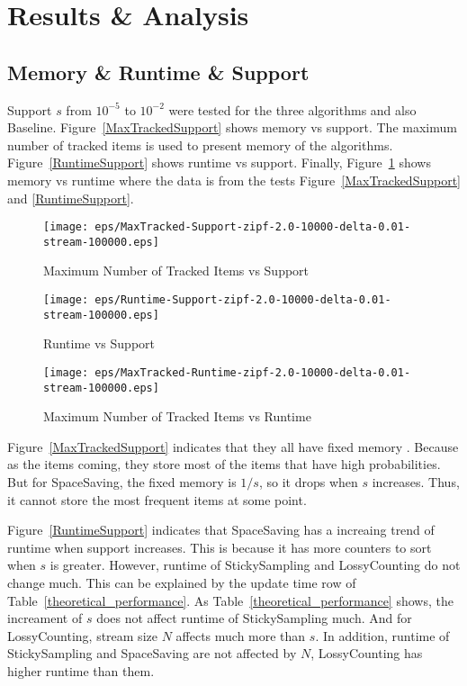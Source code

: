 \documentclass[10pt]{article}
\begin{document}
\section{Results \& Analysis} \label{resultsanalysis}

\subsection{Memory \& Runtime \& Support}
Support $s$ from $10^{-5}$ to $10^{-2}$ were tested for the three algorithms and also Baseline.
Figure~\ref{MaxTrackedSupport} shows memory vs support. 
The maximum number of tracked items is used to present memory of the algorithms.
Figure~\ref{RuntimeSupport} shows runtime vs support.
Finally, Figure~\ref{MaxTrackedRuntime} shows memory vs runtime 
where the data is from the tests Figure~\ref{MaxTrackedSupport} and \ref{RuntimeSupport}.

\begin{figure}[!htb]
      \begin{minipage}{0.48\textwidth}
        \centering
        \texttt{[image: eps/MaxTracked-Support-zipf-2.0-10000-delta-0.01-stream-100000.eps]}
        \caption{Maximum Number of Tracked Items vs Support}
        \label{MaxTrackedSupport}
      \end{minipage}\hfill
      \begin{minipage}{0.48\textwidth}
        \centering
        \texttt{[image: eps/Runtime-Support-zipf-2.0-10000-delta-0.01-stream-100000.eps]}
        \caption{Runtime vs Support}
        \label{RuntimeSupport}
      \end{minipage}
      \centering
      \begin{minipage}{0.48\textwidth}
        \centering
        \texttt{[image: eps/MaxTracked-Runtime-zipf-2.0-10000-delta-0.01-stream-100000.eps]}
        \caption{Maximum Number of Tracked Items vs Runtime}
        \label{MaxTrackedRuntime}
      \end{minipage}
\end{figure}
 Figure~\ref{MaxTrackedSupport} indicates that they all have fixed memory .
 Because as the items coming, they store most of the items that have high probabilities.
But for SpaceSaving, the fixed memory is $1/s$, so it drops when $s$ increases. 
Thus, it cannot store the most frequent items at some point. 

Figure~\ref{RuntimeSupport} indicates that SpaceSaving has a increaing trend of runtime when
support increases. This is because it has more counters to sort when $s$ is greater.
However, runtime of StickySampling and LossyCounting do not change much.
This can be explained by the update time row of Table~\ref{theoretical_performance}.
As Table~\ref{theoretical_performance} shows, the increament of $s$ does not 
affect runtime of StickySampling much. And for LossyCounting, stream size $N$
affects much more than $s$. In addition, runtime of StickySampling and SpaceSaving are not affected by $N$, 
LossyCounting has higher runtime than them.
\end{document}
